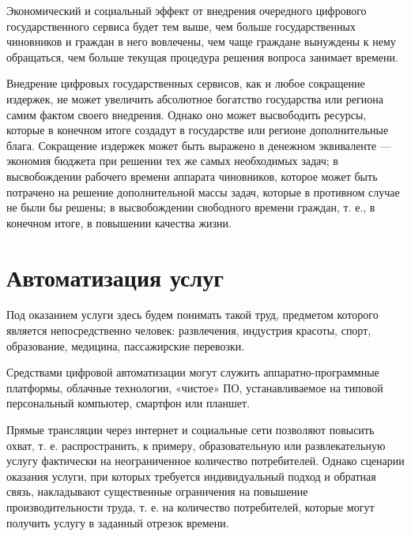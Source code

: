 \documentclass{article}
\begin{document}
Экономический и социальный эффект от внедрения очередного цифрового государственного сервиса будет тем выше, чем больше государственных чиновников и граждан в него вовлечены, чем чаще граждане вынуждены к нему обращаться, чем больше текущая процедура решения вопроса занимает времени.

Внедрение цифровых государственных сервисов, как и любое сокращение издержек, не может увеличить абсолютное богатство государства или региона самим фактом своего внедрения. Однако оно может высвободить ресурсы, которые в конечном итоге создадут в государстве или регионе дополнительные блага. Сокращение издержек может быть выражено в денежном эквиваленте — экономия бюджета при решении тех же самых необходимых задач; в высвобождении рабочего времени аппарата чиновников, которое может быть потрачено на решение дополнительной массы задач, которые в противном случае не были бы решены; в высвобождении свободного времени граждан, т. е., в конечном итоге, в повышении качества жизни.

\section*{Автоматизация услуг}

Под оказанием услуги здесь будем понимать такой труд, предметом которого является непосредственно человек: развлечения, индустрия красоты, спорт, образование, медицина, пассажирские перевозки.

Средствами цифровой автоматизации могут служить аппаратно-программные платформы, облачные технологии, «чистое» ПО, устанавливаемое на типовой персональный компьютер, смартфон или планшет.

Прямые трансляции через интернет и социальные сети позволяют повысить охват, т. е. распространить, к примеру, образовательную или развлекательную услугу фактически на неограниченное количество потребителей. Однако сценарии оказания услуги, при которых требуется индивидуальный подход и обратная связь, накладывают существенные ограничения на повышение производительности труда, т. е. на количество потребителей, которые могут получить услугу в заданный отрезок времени.
\end{document}
